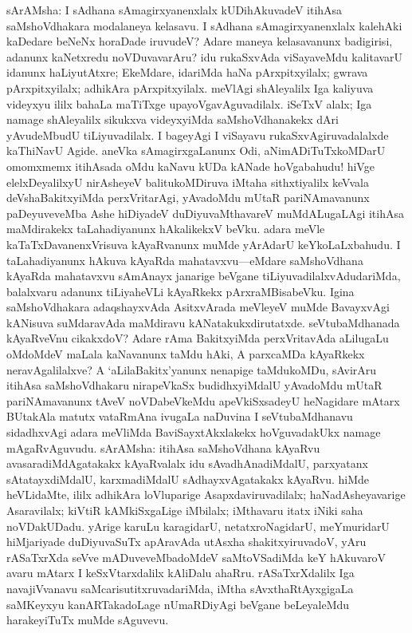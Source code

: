 \documentclass[11pt,a4size]{article}
\begin{document}
sArAMsha: I sAdhana sAmagirxyanenxlalx kUDihAkuvadeV itihAsa
saMshoVdhakara modalaneya kelasavu. I sAdhana sAmagirxyanenxlalx
kalehAki kaDedare beNeNx horaDade iruvudeV? Adare maneya kelasavanunx
badigirisi, adanunx kaNetxredu noVDuvavarAru? idu rukaSxvAda
viSayaveMdu kalitavarU idanunx haLiyutAtxre; EkeMdare, idariMda haNa
pArxpitxyilalx; gwrava pArxpitxyilalx; adhikAra
pArxpitxyilalx. meVlAgi shAleyalilx Iga kaliyuva videyxyu ililx bahaLa
maTiTxge upayoVgavAguvadilalx. iSeTxV alalx; Iga namage shAleyalilx
sikukxva videyxyiMda saMshoVdhanakekx dAri yAvudeMbudU
tiLiyuvadilalx. I bageyAgi I viSayavu rukaSxvAgiruvadalalxde kaThiNavU
Agide. aneVka sAmagirxgaLanunx Odi, aNimADiTuTxkoMDarU omomxmemx
itihAsada oMdu kaNavu kUDa kANade hoVgabahudu! hiVge elelxDeyalilxyU
nirAsheyeV balitukoMDiruva iMtaha sithxtiyalilx keVvala
deVshaBakitxyiMda perxVritarAgi, yAvadoMdu mUtaR pariNAmavanunx
paDeyuveveMba Ashe hiDiyadeV duDiyuvaMthavareV muMdALugaLAgi itihAsa
maMdirakekx taLahadiyanunx hAkalikekxV beVku. adara meVle
kaTaTxDavanenxVrisuva kAyaRvanunx muMde yArAdarU keYkoLaLxbahudu. I
taLahadiyanunx hAkuva kAyaRda mahatavxvu---eMdare saMshoVdhana kAyaRda
mahatavxvu sAmAnayx janarige beVgane tiLiyuvadilalxvAdudariMda,
balalxvaru adanunx tiLiyaheVLi kAyaRkekx pArxraMBisabeVku. Igina
saMshoVdhakara adaqshayxvAda AsitxvArada meVleyeV muMde BavayxvAgi
kANisuva suMdaravAda maMdiravu kANatakukxdirutatxde. seVtubaMdhanada
kAyaRveVnu cikakxdoV? Adare rAma BakitxyiMda perxVritavAda aLilugaLu
oMdoMdeV maLala kaNavanunx taMdu hAki, A parxcaMDa kAyaRkekx
neravAgalilalxve? A `aLilaBakitx'yanunx nenapige taMdukoMDu, sAvirAru
itihAsa saMshoVdhakaru nirapeVkaSx budidhxyiMdalU yAvadoMdu mUtaR
pariNAmavanunx tAveV noVDabeVkeMdu apeVkiSxsadeyU heNagidare mAtarx
BUtakAla matutx vataRmAna ivugaLa naDuvina I seVtubaMdhanavu
sidadhxvAgi adara meVliMda BaviSayxtAkxlakekx hoVguvadakUkx namage
mAgaRvAguvudu. sArAMsha: itihAsa saMshoVdhana kAyaRvu
avasaradiMdAgatakakx kAyaRvalalx idu sAvadhAnadiMdalU, parxyatanx
sAtatayxdiMdalU, karxmadiMdalU sAdhayxvAgatakakx kAyaRvu. hiMde
heVLidaMte, ililx adhikAra loVluparige Asapxdaviruvadilalx;
haNadAsheyavarige Asaravilalx; kiVtiR kAMkiSxgaLige iMbilalx;
iMthavaru itatx iNiki saha noVDakUDadu. yArige karuLu karagidarU,
netatxroNagidarU, meYmuridarU hiMjariyade duDiyuvaSuTx apAravAda
utAsxha shakitxyiruvadoV, yAru rASaTxrXda seVve mADuveveMbadoMdeV
saMtoVSadiMda keY hAkuvaroV avaru mAtarx I keSxVtarxdalilx kAliDalu
ahaRru. rASaTxrXdalilx Iga navajiVvanavu saMcarisutitxruvadariMda,
iMtha sAvxthaRtAyxgigaLa saMKeyxyu kanARTakadoLage nUmaRDiyAgi beVgane
beLeyaleMdu harakeyiTuTx muMde sAguvevu.
\end{document}
